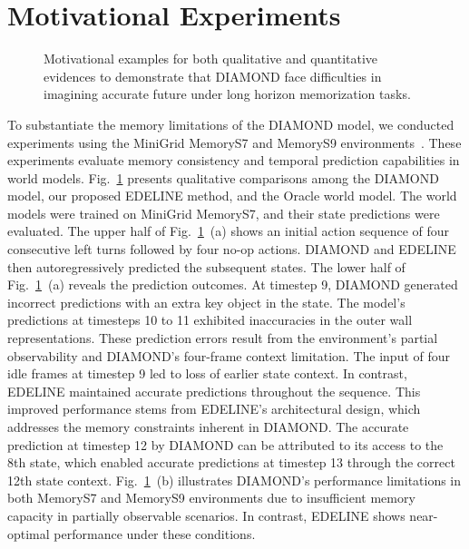 \section{Motivational Experiments}
\vspace{-0.5em}
\begin{figure}[h]
    \centering
     \vspace{-1em}

    \caption{Motivational examples for both qualitative and quantitative evidences to demonstrate that DIAMOND face difficulties in imagining accurate future under long horizon memorization tasks. }
    \label{fig:motivational_experiment} \vspace{-2em}
\end{figure}

To substantiate the memory limitations of the DIAMOND model, we conducted experiments using the MiniGrid MemoryS7 and MemoryS9 environments~\cite{chevalier-boisvert2023minigrid}. These experiments evaluate memory consistency and temporal prediction capabilities in world models. Fig.~\ref{fig:motivational_experiment} presents qualitative comparisons among the DIAMOND model, our proposed EDELINE method, and the Oracle world model. The world models were trained on MiniGrid MemoryS7, and their state predictions were evaluated. The upper half of Fig.~\ref{fig:motivational_experiment}~(a) shows an initial action sequence of four consecutive left turns followed by four no-op actions. DIAMOND and EDELINE then autoregressively predicted the subsequent states. The lower half of Fig.~\ref{fig:motivational_experiment}~(a) reveals the prediction outcomes. At timestep 9, DIAMOND generated incorrect predictions with an extra key object in the state. The model's predictions at timesteps 10 to 11 exhibited inaccuracies in the outer wall representations. These prediction errors result from the environment's partial observability and DIAMOND's four-frame context limitation. The input of four idle frames at timestep 9 led to loss of earlier state context. In contrast, EDELINE maintained accurate predictions throughout the sequence. This improved performance stems from EDELINE's architectural design, which addresses the memory constraints inherent in DIAMOND. The accurate prediction at timestep 12 by DIAMOND can be attributed to its access to the 8th state, which enabled accurate predictions at timestep 13 through the correct 12th state context. Fig.~\ref{fig:motivational_experiment}~(b) illustrates DIAMOND's performance limitations in both MemoryS7 and MemoryS9 environments due to insufficient memory capacity in partially observable scenarios. In contrast, EDELINE shows near-optimal performance under these conditions. \vspace{-1em}